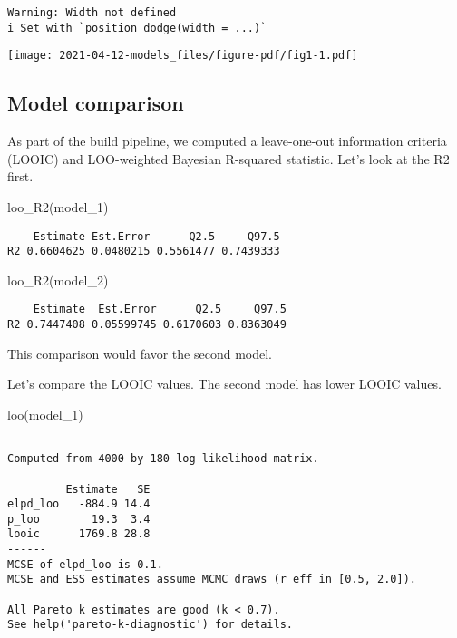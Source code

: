 \documentclass[
  letterpaper,
  DIV=11,
  numbers=noendperiod]{scrreprt}
\newenvironment{Shaded}{\begin{snugshade}}{\end{snugshade}}
\newcommand{\FunctionTok}[1]{\textcolor[rgb]{0.28,0.35,0.67}{#1}}
\newcommand{\NormalTok}[1]{\textcolor[rgb]{0.00,0.23,0.31}{#1}}
\begin{document}
\begin{verbatim}
Warning: Width not defined
i Set with `position_dodge(width = ...)`
\end{verbatim}

\texttt{[image: 2021-04-12-models\_files/figure-pdf/fig1-1.pdf]}

\subsection{Model comparison}\label{model-comparison}

As part of the build pipeline, we computed a leave-one-out information
criteria (LOOIC) and LOO-weighted Bayesian R-squared statistic. Let's
look at the R2 first.

\begin{Shaded}
\begin{Highlighting}[]
\FunctionTok{loo\_R2}\NormalTok{(model\_1)}
\end{Highlighting}
\end{Shaded}

\begin{verbatim}
    Estimate Est.Error      Q2.5     Q97.5
R2 0.6604625 0.0480215 0.5561477 0.7439333
\end{verbatim}

\begin{Shaded}
\begin{Highlighting}[]
\FunctionTok{loo\_R2}\NormalTok{(model\_2)}
\end{Highlighting}
\end{Shaded}

\begin{verbatim}
    Estimate  Est.Error      Q2.5     Q97.5
R2 0.7447408 0.05599745 0.6170603 0.8363049
\end{verbatim}

This comparison would favor the second model.

Let's compare the LOOIC values. The second model has lower LOOIC values.

\begin{Shaded}
\begin{Highlighting}[]
\FunctionTok{loo}\NormalTok{(model\_1)}
\end{Highlighting}
\end{Shaded}

\begin{verbatim}

Computed from 4000 by 180 log-likelihood matrix.

         Estimate   SE
elpd_loo   -884.9 14.4
p_loo        19.3  3.4
looic      1769.8 28.8
------
MCSE of elpd_loo is 0.1.
MCSE and ESS estimates assume MCMC draws (r_eff in [0.5, 2.0]).

All Pareto k estimates are good (k < 0.7).
See help('pareto-k-diagnostic') for details.
\end{verbatim}
\end{document}
